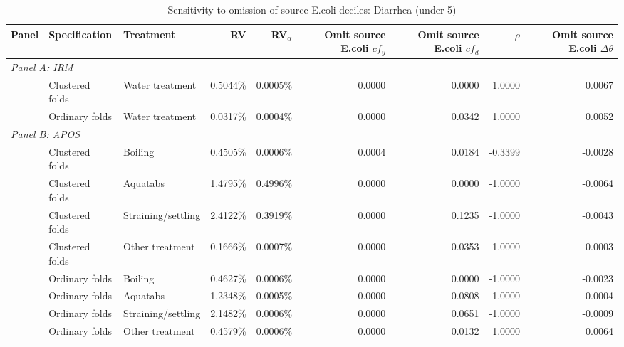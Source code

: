 \begin{landscape}
\begin{table}[p]
\centering
\caption{Sensitivity to omission of source E.coli deciles: Diarrhea (under-5)}
\label{tab:table_sensitivity_benchmark-diarrhea}
\scriptsize
\setlength{\tabcolsep}{5pt}
\renewcommand{\arraystretch}{0.92}
\begin{adjustbox}{max width=\linewidth, center}
\begin{tabular}{lllrrrrrr}
\toprule
Panel & Specification & Treatment & RV & RV$_\alpha$ & \shortstack{Omit source E.coli\\$cf_y$} & \shortstack{Omit source E.coli\\$cf_d$} & $\rho$ & \shortstack{Omit source E.coli\\$\Delta\theta$} \\
\midrule
\multicolumn{9}{l}{\textit{Panel A: IRM}} \\
 & Clustered folds & Water treatment & 0.5044\% & 0.0005\% & 0.0000 & 0.0000 & 1.0000 & 0.0067 \\
\addlinespace[3pt]
 & Ordinary folds & Water treatment & 0.0317\% & 0.0004\% & 0.0000 & 0.0342 & 1.0000 & 0.0052 \\
\midrule
\multicolumn{9}{l}{\textit{Panel B: APOS}} \\
 & Clustered folds & Boiling & 0.4505\% & 0.0006\% & 0.0004 & 0.0184 & -0.3399 & -0.0028 \\
 & Clustered folds & Aquatabs & 1.4795\% & 0.4996\% & 0.0000 & 0.0000 & -1.0000 & -0.0064 \\
 & Clustered folds & Straining/settling & 2.4122\% & 0.3919\% & 0.0000 & 0.1235 & -1.0000 & -0.0043 \\
 & Clustered folds & Other treatment & 0.1666\% & 0.0007\% & 0.0000 & 0.0353 & 1.0000 & 0.0003 \\
\addlinespace[3pt]
 & Ordinary folds & Boiling & 0.4627\% & 0.0006\% & 0.0000 & 0.0000 & -1.0000 & -0.0023 \\
 & Ordinary folds & Aquatabs & 1.2348\% & 0.0005\% & 0.0000 & 0.0808 & -1.0000 & -0.0004 \\
 & Ordinary folds & Straining/settling & 2.1482\% & 0.0006\% & 0.0000 & 0.0651 & -1.0000 & -0.0009 \\
 & Ordinary folds & Other treatment & 0.4579\% & 0.0006\% & 0.0000 & 0.0132 & 1.0000 & 0.0064 \\
\bottomrule
\end{tabular}
\end{adjustbox}

\end{table}
\end{landscape}
